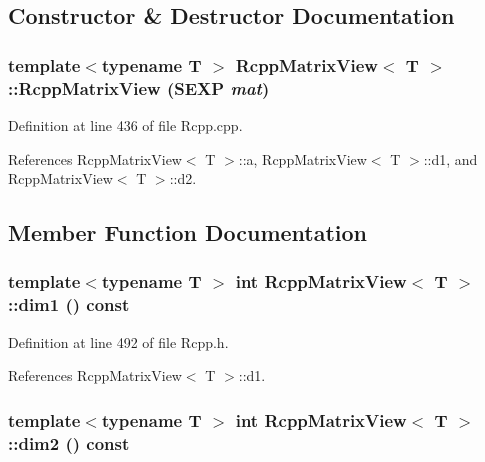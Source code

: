 \subsection{Constructor \& Destructor Documentation}
\hypertarget{classRcppMatrixView_c3489c6a24c2975f3ea7103ada50e328}{
\subsubsection[{RcppMatrixView}]{\setlength{\rightskip}{0pt plus 5cm}template$<$typename T $>$ {\bf RcppMatrixView}$<$ T $>$::{\bf RcppMatrixView} (SEXP {\em mat})}}
\label{classRcppMatrixView_c3489c6a24c2975f3ea7103ada50e328}




Definition at line 436 of file Rcpp.cpp.

References RcppMatrixView$<$ T $>$::a, RcppMatrixView$<$ T $>$::d1, and RcppMatrixView$<$ T $>$::d2.

\subsection{Member Function Documentation}
\hypertarget{classRcppMatrixView_72d1d7fcdc4b1cc6dd877b1df2f9f5e6}{
\subsubsection[{dim1}]{\setlength{\rightskip}{0pt plus 5cm}template$<$typename T $>$ int {\bf RcppMatrixView}$<$ T $>$::dim1 () const}}
\label{classRcppMatrixView_72d1d7fcdc4b1cc6dd877b1df2f9f5e6}




Definition at line 492 of file Rcpp.h.

References RcppMatrixView$<$ T $>$::d1.\hypertarget{classRcppMatrixView_ebb7f65646ce780c897dc39f31899439}{
\subsubsection[{dim2}]{\setlength{\rightskip}{0pt plus 5cm}template$<$typename T $>$ int {\bf RcppMatrixView}$<$ T $>$::dim2 () const}}
\label{classRcppMatrixView_ebb7f65646ce780c897dc39f31899439}




